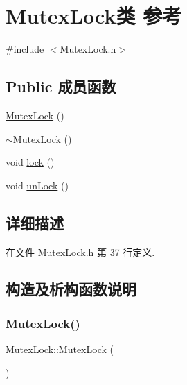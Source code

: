 \hypertarget{class_mutex_lock}{}\section{Mutex\+Lock类 参考}
\label{class_mutex_lock}


{\ttfamily \#include $<$Mutex\+Lock.\+h$>$}

\subsection*{Public 成员函数}
\begin{DoxyCompactItemize}
\item 
\hyperlink{class_mutex_lock_ad8877baf855ab12a749eb8cb509fea63}{Mutex\+Lock} ()
\item 
\hyperlink{class_mutex_lock_ad00ab7ab87cdf453bec5a5b90f447847}{$\sim$\+Mutex\+Lock} ()
\item 
void \hyperlink{class_mutex_lock_a78d4fe5df4e15cffc2b647e7efb9a58a}{lock} ()
\item 
void \hyperlink{class_mutex_lock_a442ba1ef110b2f08476a56fc68725668}{un\+Lock} ()
\end{DoxyCompactItemize}


\subsection{详细描述}


在文件 Mutex\+Lock.\+h 第 37 行定义.



\subsection{构造及析构函数说明}
\mbox{\label{class_mutex_lock_ad8877baf855ab12a749eb8cb509fea63}} 
\subsubsection{\texorpdfstring{Mutex\+Lock()}{MutexLock()}}
{\footnotesize\ttfamily Mutex\+Lock\+::\+Mutex\+Lock (\begin{DoxyParamCaption}{ }\end{DoxyParamCaption})\hspace{0.3cm}{\ttfamily [inline]}}



